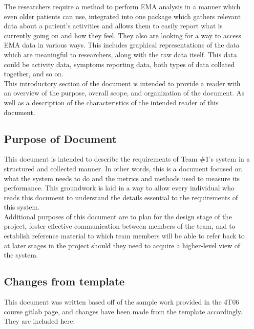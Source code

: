 \documentclass[12pt]{article}
\begin{document}
The researchers require a method to perform EMA analysis in a manner which even older patients can use, integrated into one package which gathers relevant data about a patient's activities and allows them to easily report what is currently going on and how they feel. They also are looking for a way to access EMA data in various ways. This includes graphical representations of the data which are meaningful to researchers, along with the raw data itself. This data could be activity data, symptoms reporting data, both types of data collated together, and so on. \\


This introductory section of the document is intended to provide a reader with an overview of the purpose, overall scope, and organization of the document. As well as a description of the characteristics of the intended reader of this document.\\

\subsection{Purpose of Document}

This document is intended to describe the requirements of Team \#1's system in a structured and collected manner. In other words, this is a document focused on what the system needs to do and the metrics and methods used to measure its performance. This groundwork is laid in a way to allow every individual who reads this document to understand the details essential to the requirements of this system.\\

Additional purposes of this document are to plan for the design stage of the project, foster effective communication between members of the team, and to establish reference material to which team members will be able to refer back to at later stages in the project should they need to acquire a higher-level view of the system.

\subsection{Changes from template}
This document was written based off of the sample work provided in the 4T06 course gitlab page, and changes have been made from the template accordingly. They are included here:\\
\end{document}
